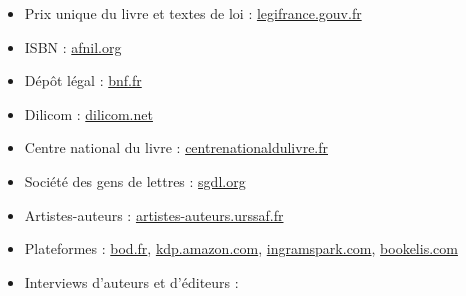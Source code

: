 \begin{itemize}
  \item Prix unique du livre et textes de loi :
        \href{https://www.legifrance.gouv.fr}{legifrance.gouv.fr}
  \item ISBN : \href{https://www.afnil.org}{afnil.org}
  \item Dépôt légal : \href{https://www.bnf.fr}{bnf.fr}
  \item Dilicom : \href{https://www.dilicom.net}{dilicom.net}
  \item Centre national du livre : \href{https://centrenationaldulivre.fr}{centrenationaldulivre.fr}
  \item Société des gens de lettres : \href{https://www.sgdl.org}{sgdl.org}
  \item Artistes-auteurs : \href{https://www.artistes-auteurs.urssaf.fr}{artistes-auteurs.urssaf.fr}
  \item Plateformes : \href{https://www.bod.fr}{bod.fr},
        \href{https://kdp.amazon.com}{kdp.amazon.com},
        \href{https://www.ingramspark.com}{ingramspark.com},
        \href{https://www.bookelis.com}{bookelis.com}
  \item Interviews d’auteurs et d’éditeurs : \href{\plYoutubeURL}{\plYoutubeAffichage}
\end{itemize}
